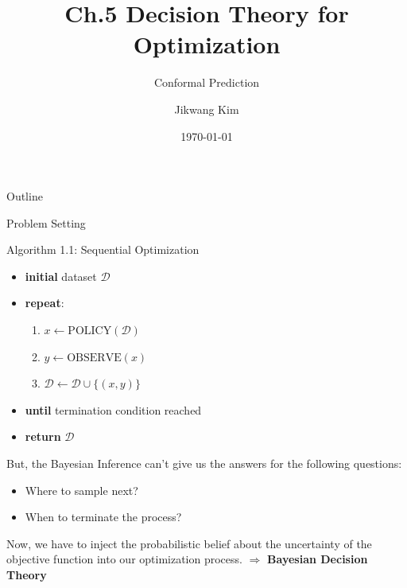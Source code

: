 \documentclass[9pt]{beamer}
\title{Ch.5 Decision Theory for Optimization}
\subtitle{Conformal Prediction}
\author{Jikwang Kim}
\institute{Seoul National University}
\date{\today}
\begin{document}
\begin{frame}
  \titlepage
\end{frame}

\begin{frame}{Outline}
  \tableofcontents
\end{frame}

\begin{frame}{Problem Setting}
  \begin{exampleblock}{Algorithm 1.1: Sequential Optimization}
    \begin{itemize}
        \item \textbf{initial} dataset $\mathcal{D}$
        \item \textbf{repeat}:
        
        \begin{enumerate}
            \item $x \leftarrow \text{POLICY}(\mathcal{D})$
            \item $y \leftarrow \text{OBSERVE}(x)$
            \item $\mathcal{D} \leftarrow \mathcal{D} \cup \{(x, y)\}$
        \end{enumerate}
        \item \textbf{until} termination condition reached
        \item \textbf{return} $\mathcal{D}$
    \end{itemize}
  \end{exampleblock}

  \vspace{1.0em}
  But, the Bayesian Inference can't give us the answers for the following questions:
    \begin{itemize}
        \item Where to sample next?
        \item When to terminate the process?
    \end{itemize}
  Now, we have to inject the probabilistic belief about the uncertainty of the objective function into our optimization process. 
  \vspace{0.5em}
  \newline
  $\Rightarrow$ \textbf{Bayesian Decision Theory}
\end{frame}
\end{document}
